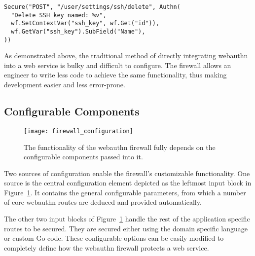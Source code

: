 


\begin{lstlisting}[float=h]
Secure("POST", "/user/settings/ssh/delete", Authn(
  "Delete SSH key named: %v",
  wf.SetContextVar("ssh_key", wf.Get("id")),
  wf.GetVar("ssh_key").SubField("Name"),
))
\end{lstlisting}

As demonstrated above, the traditional method of directly integrating webauthn into a web service is bulky and difficult to configure. The firewall allows an engineer to write less code to achieve the same functionality, thus making development easier and less error-prone.




\subsection{Configurable Components}

\begin{figure}[h]
  \centering
  \texttt{[image: firewall\_configuration]}
  \caption{The functionality of the webauthn firewall fully depends on the configurable components passed into it.}\label{Fig:ConfigurableComponents}
\end{figure}

Two sources of configuration enable the firewall's customizable functionality. One source is the central configuration element depicted as the leftmost input block in Figure~\ref{Fig:ConfigurableComponents}. It contains the general configurable parameters, from which a number of core webauthn routes are deduced and provided automatically.

The other two input blocks of Figure~\ref{Fig:ConfigurableComponents} handle the rest of the application specific routes to be secured. They are secured either using the domain specific language or custom Go code. These configurable options can be easily modified to completely define how the webauthn firewall protects a web service. 

